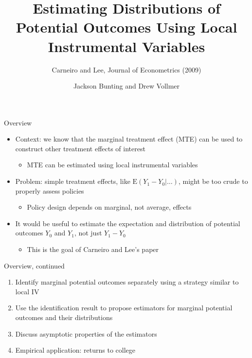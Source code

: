 \documentclass{beamer}
\newcommand{\E}{\mathrm{E}} %
\begin{document}
\title[Distributions of Potential Outcomes]{Estimating Distributions
  of Potential Outcomes Using Local Instrumental Variables}
\subtitle{Carneiro and Lee, Journal of Econometrics (2009)}
\author[]{Jackson Bunting and Drew Vollmer}
\frame{\maketitle}


\begin{frame}{Overview}

\begin{itemize}

\item Context: we know that the marginal treatment effect (MTE) can be
  used to construct other treatment effects of interest
\begin{itemize}
\item MTE can be estimated using local instrumental variables
\end{itemize}

\pause

\item Problem: simple treatment effects, like $\E(Y_1 - Y_0 | \dots)$,
  might be too crude to properly assess policies
\begin{itemize}
\item Policy design depends on marginal, not average, effects
\end{itemize}

\pause

\item It would be useful to estimate the expectation and distribution
  of potential outcomes $Y_0$ and $Y_1$, not just $Y_1 - Y_0$
\begin{itemize}
\item This is the goal of Carneiro and Lee's paper
\end{itemize}

\end{itemize}

\end{frame}


\begin{frame}{Overview, continued}

\begin{enumerate}

\item Identify marginal potential outcomes separately using a strategy
  similar to local IV

\item Use the identification result to propose estimators for marginal
  potential outcomes and their distributions

\item Discuss asymptotic properties of the estimators

\item Empirical application: returns to college

\end{enumerate}

\end{frame}
\end{document}
